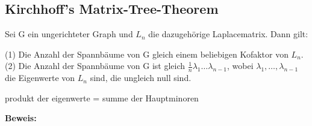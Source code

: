 \subsection{Kirchhoff's Matrix-Tree-Theorem}
\begin{Tms}
Sei G ein ungerichteter Graph und $L_n$  die dazugehörige Laplacematrix. 
Dann gilt:
\par
\begingroup
\leftskip=20pt%
\rightskip=20pt
\noindent %
(1) Die Anzahl der Spannbäume von G gleich einem beliebigen Kofaktor von $L_n$.\\
(2) Die Anzahl der Spannbäume von G ist gleich $\frac{1}{n}\lambda_1\ldots\lambda_{n-1}$, wobei $\lambda_1,\ldots,\lambda_{n-1}$ die Eigenwerte von $L_n$ sind, die ungleich null sind.
\par
\endgroup
\end{Tms}

\begin{Lm}
 produkt der eigenwerte = summe der Hauptminoren
\end{Lm}

\textbf{Beweis:}
 
